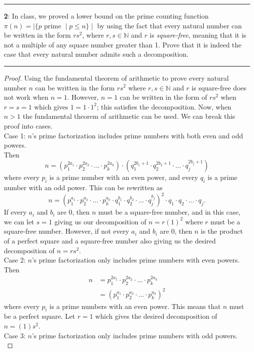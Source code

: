 \documentclass[11pt]{article}
\newcommand\question[2]{\vspace{.25in}\hrule\textbf{#1}: #2\vspace{.5em}\hrule\vspace{.10in}}
\newcommand{\N}{\mathbb{N}}
\begin{document}
\question{2}{In class, we proved a lower bound on the prime counting function $\pi (n) = \mid \{ p \text{ prime } \mid p \le n\} \mid$ by using the fact that every natural number can be written in the form $rs^2$, where $r,s \in \N$ and $r$ is \textit{square-free}, meaning that it is not a multiple of any square number greater than 1. Prove that it is indeed the case that every natural number admits such a decomposition.}

\begin{proof}
	Using the fundamental theorem of arithmetic to prove every natural number $n$ can be written in the form $rs^2$ where $r,s \in \N$ and $r$ is square-free does not work when $n=1$. However, $n=1$ can be written in the form of $rs^2$ when $r=s=1$ which gives $1=1\cdot1^2$; this satisfies the decomposition. Now, when $n>1$ the fundamental theorem of arithmetic can be used. We can break this proof into cases.\\
	Case 1: $n$'s prime factorization includes prime numbers with both even and odd powers.\\
	Then $$n=(p_1^{2a_1} \cdot p_2^{2a_2} \cdot \ldots \cdot p_k^{2a_k}) \cdot (q_1^{2b_1+1} \cdot q_2^{2b_2+1} \cdot \ldots \cdot q_j^{2b_j+1})$$ where every $p_i$ is a prime number with an even power, and every $q_i$ is a prime number with an odd power. This can be rewritten as $$n=(p_1^{a_1} \cdot p_2^{a_2} \cdot \ldots \cdot p_k^{a_k} \cdot q_1^{b_1} \cdot q_2^{b_2} \cdot \ldots \cdot q_j^{b_j})^2 \cdot q_1 \cdot q_2 \cdot \ldots \cdot q_j.$$ If every $a_i$ and $b_i$ are 0, then $n$ must be a square-free number, and in this case, we can let $s=1$ giving us our decomposition of $n=r(1)^2$ where $r$ must be a square-free number. However, if not every $a_i$ and $b_i$ are 0, then $n$ is the product of a perfect square and a square-free number also giving us the desired decomposition of $n=rs^2$.\\
	Case 2: $n$'s prime factorization only includes prime numbers with even powers.\\
	Then
	\begin{align*}
	 	n&=p_1^{2a_1} \cdot p_2^{2a_2} \cdot \ldots \cdot p_k^{2a_k}\\
	 	&= (p_1^{a_1} \cdot p_2^{a_2} \cdot \ldots \cdot p_k^{a_k})^2
	\end{align*}
	where every $p_i$ is a prime numbers with an even power. This means that $n$ must be a perfect square. Let $r=1$ which gives the desired decomposition of $n=(1)s^2$.\\
	Case 3: $n$'s prime factorization only includes prime numbers with odd powers.\\

\end{proof}
\end{document}
